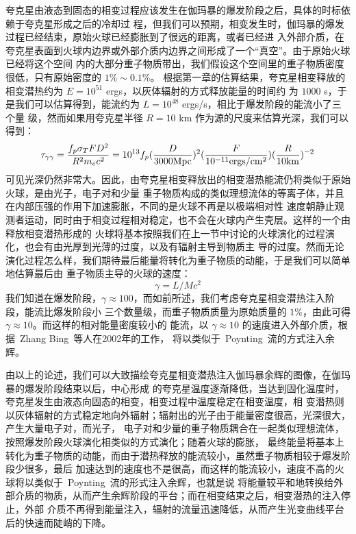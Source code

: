 夸克星由液态到固态的相变过程应该发生在伽玛暴的爆发阶段之后，具体的时标依赖于夸克星形成之后的冷却过
程，但我们可以预期，相变发生时，伽玛暴的爆发过程已经结束，原始火球已经膨胀到了很远的距离，或者已经进
入外部介质，在夸克星表面到火球内边界或外部介质内边界之间形成了一个“真空”。由于原始火球已经将这个空间
内的大部分重子物质带出，我们假设这个空间里的重子物质密度很低，只有原始密度的 $1\% \sim 0.1\%$。
根据第一章的估算结果，夸克星相变释放的相变潜热约为 $E=10^{51}$ ergs，以灰体辐射的方式释放能量的时间约
为 $1000$ s，于是我们可以估算得到，能流约为 $L=10^{48}$ ergs/s，相比于爆发阶段的能流小了三个量
级，然而如果用夸克星半径 $R=10$ km 作为源的尺度来估算光深，我们可以得到：
\begin{equation}
\tau_{\gamma\gamma}=\frac{f_{p}\sigma_{T}FD^{2}}{R^{2}m_{e}c^{2}}=10^{13}f_{p}(\frac{D}{3000\rm{Mpc}})^{2}(\frac{F}{10^{-11}\rm{ergs/cm^{2}}})(\frac{R}{10\rm{km}})^{-2}
\end{equation}
可见光深仍然非常大。因此，由夸克星相变释放出的相变潜热能流仍将类似于原始火球，是由光子，电子对和少量
重子物质构成的类似理想流体的等离子体，并且在内部压强的作用下加速膨胀，不同的是火球不再是以极端相对性
速度朝静止观测者运动，同时由于相变过程相对稳定，也不会在火球内产生壳层。这样的一个由释放相变潜热形成的
火球将基本按照我们在上一节中讨论的火球演化的过程演化，也会有由光厚到光薄的过度，以及有辐射主导到物质主
导的过度。然而无论演化过程怎么样，我们期待最后能量将转化为重子物质的动能，于是我们可以简单地估算最后由
重子物质主导的火球的速度：
\begin{equation}
\gamma=L/Mc^{2}
\end{equation}
我们知道在爆发阶段，$\gamma\approx100$，而如前所述，我们考虑夸克星相变潜热注入阶段，能流比爆发阶段小
三个数量级，而重子物质质量为原始质量的 $1\%$，由此可得 $\gamma\approx10$。而这样的相对能量密度较小的
能流，以 $\gamma\approx10$ 的速度进入外部介质，根据~Zhang Bing~等人在2002年的工作，
将以类似于~Poynting~流的方式注入余辉。

由以上的论述，我们可以大致描绘夸克星相变潜热注入伽玛暴余辉的图像，在伽玛暴的爆发阶段结束以后，中心形成
的夸克星温度逐渐降低，当达到固化温度时，夸克星发生由液态向固态的相变，相变过程中温度稳定在相变温度，相
变潜热则以灰体辐射的方式稳定地向外辐射；辐射出的光子由于能量密度很高，光深很大，产生大量电子对，而光子，
电子对和少量的重子物质耦合在一起类似理想流体，按照爆发阶段火球演化相类似的方式演化；随着火球的膨胀，
最终能量将基本上转化为重子物质的动能，而由于潜热释放的能流较小，虽然重子物质相较于爆发阶段少很多，最后
加速达到的速度也不是很高，而这样的能流较小，速度不高的火球将以类似于~Poynting~流的形式注入余辉，也就是说
将能量较平和地转换给外部介质的物质，从而产生余辉阶段的平台；而在相变结束之后，相变潜热的注入停止，外部
介质不再得到能量注入，辐射的流量迅速降低，从而产生光变曲线平台后的快速而陡峭的下降。

